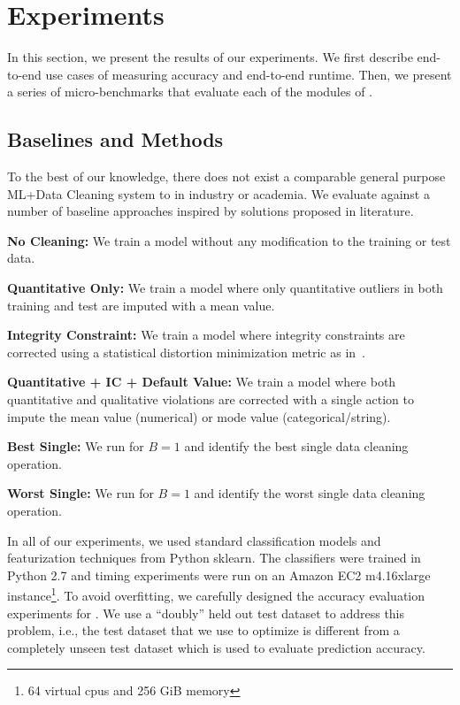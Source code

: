 \section{Experiments}
In this section, we present the results of our experiments.
We first describe end-to-end use cases of \sys measuring accuracy and end-to-end runtime.
Then, we present a series of micro-benchmarks that evaluate each of the modules of \sys.

\subsection{Baselines and Methods}
To the best of our knowledge, there does not exist a comparable general purpose ML+Data Cleaning system to \sys in industry or academia.
We evaluate \sys against a number of baseline approaches inspired by solutions proposed in literature. 

\vspace{0.25em}\noindent\textbf{No Cleaning: } We train a model without any modification to the training or test data.

\vspace{0.25em}\noindent\textbf{Quantitative Only: } We train a model where only quantitative outliers in both training and test are imputed with a mean value. 

\vspace{0.25em}\noindent\textbf{Integrity Constraint: } We train a model where integrity constraints are corrected using a statistical distortion minimization metric as in~\cite{prokoshyna2015combining}.

\vspace{0.25em}\noindent\textbf{Quantitative + IC + Default Value: } We train a model where both quantitative and qualitative violations are corrected with a single action to impute the mean value (numerical) or mode value (categorical/string).

\vspace{0.25em}\noindent\textbf{Best Single: } We run \sys for $B=1$ and identify the best single data cleaning operation.

\vspace{0.25em}\noindent\textbf{Worst Single: } We run \sys for $B=1$ and identify the worst single data cleaning operation.

\vspace{0.25em}
In all of our experiments, we used standard classification models and featurization techniques from Python \textsf{sklearn}.
The classifiers were trained in Python 2.7 and timing experiments were run on an Amazon EC2 m4.16xlarge instance\footnote{64 virtual cpus and 256 GiB memory}.
To avoid overfitting, we carefully designed the accuracy evaluation experiments for \sys.
We use a ``doubly'' held out test dataset to address this problem, i.e., the test dataset that we use to optimize \sys is different from a completely unseen test dataset which is used to evaluate prediction accuracy.

